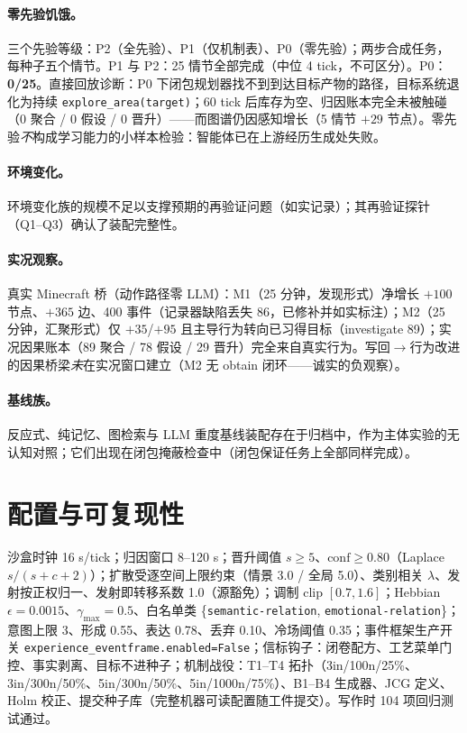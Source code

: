 \documentclass[10pt,a4paper]{ctexart}
\begin{document}
\paragraph{零先验饥饿。}三个先验等级：P2（全先验）、P1（仅机制表）、P0（零先验）；两步合成任务，每种子五个情节。P1 与 P2：25 情节全部完成（中位 4 tick，不可区分）。P0：\textbf{0/25}。直接回放诊断：P0 下闭包规划器找不到到达目标产物的路径，目标系统退化为持续 \texttt{explore\_area(target)}；60 tick 后库存为空、归因账本完全未被触碰（0 聚合 / 0 假设 / 0 晋升）——而图谱仍因感知增长（5 情节 $+29$ 节点）。零先验\emph{不}构成学习能力的小样本检验：智能体已在上游经历生成处失败。

\paragraph{环境变化。}环境变化族的规模不足以支撑预期的再验证问题（如实记录）；其再验证探针（Q1--Q3）确认了装配完整性。

\paragraph{实况观察。}真实 Minecraft 桥（动作路径零 LLM）：M1（25 分钟，发现形式）净增长 $+100$ 节点、$+365$ 边、400 事件（记录器缺陷丢失 86，已修补并如实标注）；M2（25 分钟，汇聚形式）仅 $+35$/$+95$ 且主导行为转向已习得目标（investigate 89）；实况因果账本（89 聚合 / 78 假设 / 29 晋升）完全来自真实行为。写回$\rightarrow$行为改进的因果桥梁\emph{未}在实况窗口建立（M2 无 obtain 闭环——诚实的负观察）。

\paragraph{基线族。}反应式、纯记忆、图检索与 LLM 重度基线装配存在于归档中，作为主体实验的无认知对照；它们出现在闭包掩蔽检查中（闭包保证任务上全部同样完成）。

\section{配置与可复现性}
\label{s13:config}

沙盒时钟 16 s/tick；归因窗口 8--120 s；晋升阈值 $s\ge5$、$\mathrm{conf}\ge0.80$（Laplace $s/(s+c+2)$）；扩散受逐空间上限约束（情景 3.0 / 全局 5.0）、类别相关 $\lambda$、发射按正权归一、发射即转移系数 1.0（源豁免）；调制 clip $[0.7,1.6]$；Hebbian $\epsilon{=}0.0015$、$\gamma_{\max}{=}0.5$、白名单类 \{\texttt{semantic-relation}, \texttt{emotional-relation}\}；意图上限 3、形成 0.55、表达 0.78、丢弃 0.10、冷场阈值 0.35；事件框架生产开关 \texttt{experience\_eventframe.enabled=False}；信标钩子：闭卷配方、工艺菜单门控、事实剥离、目标不进种子；机制战役：T1--T4 拓扑（3in/100n/25\%、3in/300n/50\%、5in/300n/50\%、5in/1000n/75\%）、B1--B4 生成器、JCG 定义、Holm 校正、提交种子库（完整机器可读配置随工件提交）。写作时 104 项回归测试通过。
\end{document}
